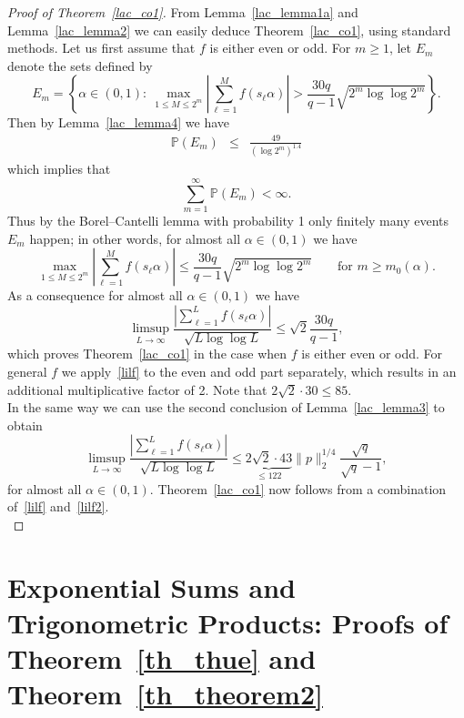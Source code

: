 \documentclass[12pt]{amsart}
\newcommand {\p} {\mathbb{P}}
\begin{document}
 
\begin{proof}[Proof of Theorem~\ref{lac_co1}]
 From Lemma~\ref{lac_lemma1a} and Lemma~\ref{lac_lemma2} we can easily deduce Theorem~\ref{lac_co1}, using standard methods. Let us first assume that $f$ is either even or odd. For $m \geq 1$, let $E_m$ denote the sets defined by 
 $$
 E_{m} = \left\{ \alpha \in (0,1):~ \max_{1 \leq M \leq 2^m} \left| \sum_{\ell=1}^M f(s_\ell \alpha) \right| >  \frac{30 q}{q-1} \sqrt{2^m \log \log 2^m} \right\}.
 $$
 Then by Lemma~\ref{lac_lemma4} we have
 \begin{eqnarray}
 \p (E_m) & \leq & \frac{49}{\left(\log 2^m\right)^{1.4}} \label{prob2}
 \end{eqnarray}
 which implies that
 $$
 \sum_{m=1}^\infty \p (E_m) < \infty.
 $$
 Thus by the Borel--Cantelli lemma with probability 1 only finitely many events $E_m$ happen; in other words, for almost all $\alpha \in (0,1)$ we have
 $$
 \max_{1 \leq M \leq 2^m} \left| \sum_{\ell=1}^M f(s_\ell \alpha) \right|  \leq \frac{30 q}{q-1} \sqrt{2^m \log \log 2^m} \qquad \textrm{for $m \geq m_0(\alpha)$}.
 $$
As a consequence for almost all $\alpha \in (0,1)$ we have
\begin{equation} \label{lilf}
\limsup_{L \to \infty} \frac{\left| \sum_{\ell=1}^L f(s_\ell \alpha) \right|}{\sqrt{L \log \log L}} \leq \sqrt{2} \frac{30 q}{q-1},
\end{equation}
which proves Theorem~\ref{lac_co1} in the case when $f$ is either even or odd. For general $f$ we apply~\eqref{lilf} to the even and odd part separately, which results in an additional multiplicative factor of 2. Note that $2 \sqrt{2} \cdot 30 \leq 85$.\\

In the same way we can use the second conclusion of Lemma~\ref{lac_lemma3} to obtain
\begin{equation} \label{lilf2}
\limsup_{L \to \infty} \frac{\left| \sum_{\ell=1}^L f(s_\ell \alpha) \right|}{\sqrt{L \log \log L}} \leq \underbrace{2 \sqrt{2} \cdot 43}_{\leq 122} \|p\|_2^{1/4} \frac{\sqrt{q}}{\sqrt{q}-1},
\end{equation}
for almost all $\alpha \in (0,1)$. Theorem~\ref{lac_co1} now follows from a combination of~\eqref{lilf} and~\eqref{lilf2}.\\
\end{proof}

\section{Exponential Sums and Trigonometric Products: Proofs of Theorem~\ref{th_thue} and Theorem~\ref{th_theorem2}} \label{sect_proof}
\end{document}
